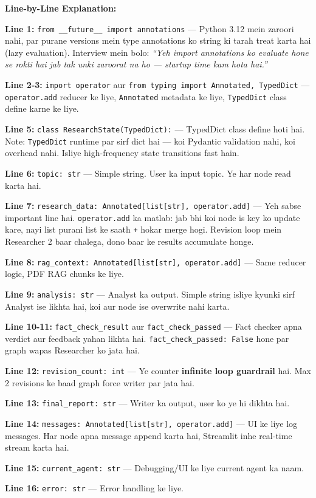 \documentclass[11pt, a4paper]{article}
\begin{document}
\begin{codestorybox}
\textbf{Line-by-Line Explanation:}

\textbf{Line 1:} \texttt{from \_\_future\_\_ import annotations} --- Python 3.12 mein zaroori nahi, par purane versions mein type annotations ko string ki tarah treat karta hai (lazy evaluation). Interview mein bolo: \textit{``Yeh import annotations ko evaluate hone se rokti hai jab tak unki zaroorat na ho --- startup time kam hota hai.''}

\textbf{Line 2-3:} \texttt{import operator} aur \texttt{from typing import Annotated, TypedDict} --- \texttt{operator.add} reducer ke liye, \texttt{Annotated} metadata ke liye, \texttt{TypedDict} class define karne ke liye.

\textbf{Line 5:} \texttt{class ResearchState(TypedDict):} --- TypedDict class define hoti hai. Note: \texttt{TypedDict} runtime par sirf dict hai --- koi Pydantic validation nahi, koi overhead nahi. Isliye high-frequency state transitions fast hain.

\textbf{Line 6:} \texttt{topic: str} --- Simple string. User ka input topic. Ye har node read karta hai.

\textbf{Line 7:} \texttt{research\_data: Annotated[list[str], operator.add]} --- Yeh sabse important line hai. \texttt{operator.add} ka matlab: jab bhi koi node is key ko update kare, nayi list purani list ke saath \texttt{+} hokar merge hogi. Revision loop mein Researcher 2 baar chalega, dono baar ke results accumulate honge.

\textbf{Line 8:} \texttt{rag\_context: Annotated[list[str], operator.add]} --- Same reducer logic, PDF RAG chunks ke liye.

\textbf{Line 9:} \texttt{analysis: str} --- Analyst ka output. Simple string isliye kyunki sirf Analyst ise likhta hai, koi aur node ise overwrite nahi karta.

\textbf{Line 10-11:} \texttt{fact\_check\_result} aur \texttt{fact\_check\_passed} --- Fact checker apna verdict aur feedback yahan likhta hai. \texttt{fact\_check\_passed: False} hone par graph wapas Researcher ko jata hai.

\textbf{Line 12:} \texttt{revision\_count: int} --- Ye counter \textbf{infinite loop guardrail} hai. Max 2 revisions ke baad graph force writer par jata hai.

\textbf{Line 13:} \texttt{final\_report: str} --- Writer ka output, user ko ye hi dikhta hai.

\textbf{Line 14:} \texttt{messages: Annotated[list[str], operator.add]} --- UI ke liye log messages. Har node apna message append karta hai, Streamlit inhe real-time stream karta hai.

\textbf{Line 15:} \texttt{current\_agent: str} --- Debugging/UI ke liye current agent ka naam.

\textbf{Line 16:} \texttt{error: str} --- Error handling ke liye.
\end{codestorybox}
\end{document}
